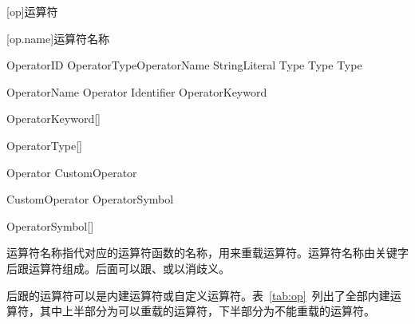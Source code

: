 
[op]{运算符}

[op.name]{运算符名称}

\begin{bnf}{OperatorID}
     OperatorType\bnfq OperatorName \br
     StringLiteral \br
     \terminal{\$} \br
      \br
      Type \br
      Type \br
       Type
\end{bnf}

\begin{bnf}{OperatorName}
    Operator \br
    Identifier \br
    OperatorKeyword \br
    \terminal{(} \terminal{)} \br
    \terminal{[} \terminal{]}
\end{bnf}

\begin{bnf}{OperatorKeyword}[\oneof]
\end{bnf}

\begin{bnf}{OperatorType}[\oneof]
\end{bnf}

\begin{bnf}{Operator}
    CustomOperator \br
    \terminal{;}
\end{bnf}

\begin{bnf}{CustomOperator}
    \bnfq OperatorSymbol\bnfp
\end{bnf}

\begin{bnf}{OperatorSymbol}[\oneof]
\end{bnf}

\pnum
运算符名称指代对应的运算符函数的名称，用来重载运算符。运算符名称由关键字后跟运算符组成。后面可以跟、或以消歧义。

\pnum
{}后跟的运算符可以是内建运算符或自定义运算符。表~\ref{tab:op}~列出了全部内建运算符，其中上半部分为可以重载的运算符，下半部分为不能重载的运算符。

